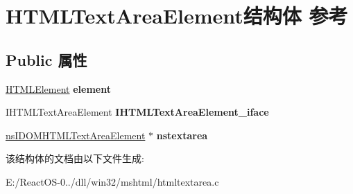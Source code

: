 \hypertarget{struct_h_t_m_l_text_area_element}{}\section{H\+T\+M\+L\+Text\+Area\+Element结构体 参考}
\label{struct_h_t_m_l_text_area_element}
\subsection*{Public 属性}
\begin{DoxyCompactItemize}
\item 
\mbox{\label{struct_h_t_m_l_text_area_element_a8f6ce96e38bec105f0cb447ddfae4aec}} 
\hyperlink{struct_h_t_m_l_element}{H\+T\+M\+L\+Element} {\bfseries element}
\item 
\mbox{\label{struct_h_t_m_l_text_area_element_a8de85cb91634e46ab95d0a8ca1f09015}} 
I\+H\+T\+M\+L\+Text\+Area\+Element {\bfseries I\+H\+T\+M\+L\+Text\+Area\+Element\+\_\+iface}
\item 
\mbox{\label{struct_h_t_m_l_text_area_element_aa695a7754251f17c2dab701a9fec0de4}} 
\hyperlink{interfacens_i_d_o_m_h_t_m_l_text_area_element}{ns\+I\+D\+O\+M\+H\+T\+M\+L\+Text\+Area\+Element} $\ast$ {\bfseries nstextarea}
\end{DoxyCompactItemize}


该结构体的文档由以下文件生成\+:\begin{DoxyCompactItemize}
\item 
E\+:/\+React\+O\+S-\/0../dll/win32/mshtml/htmltextarea.\+c\end{DoxyCompactItemize}

